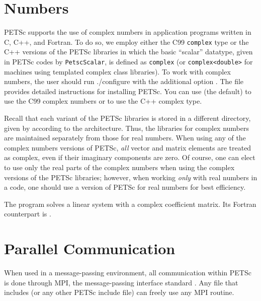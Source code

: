 {{\section{Numbers}  \label{sec_complex}

PETSc supports the use of complex numbers in application programs
written in C, C++, and Fortran.  To do so, we employ either the C99 \lstinline{complex} type or the C++ versions of
the PETSc libraries in which the basic ``scalar'' datatype, given in
PETSc codes by \lstinline{PetscScalar}, is defined as \lstinline{complex} (or \lstinline{complex<double>}
 for machines using templated complex class
libraries).  To work with complex numbers,
the user should run ./configure with the additional option .
The file \href{https://www.mcs.anl.gov/petsc/documentation/installation.html}{}
provides detailed instructions for installing PETSc. 
You can use  (the default) to use the C99 complex numbers or  to use the C++ complex type. 

Recall that each variant of the PETSc libraries is stored in a
different directory, given by
according to the architecture. Thus, the
libraries for complex
numbers are maintained separately from those for real
numbers.  When using any of the complex numbers versions of PETSc,
{\em all} vector and matrix elements are treated as complex,
even if their imaginary components are zero.
Of course, one can elect to use only the real parts of the complex
numbers when using the complex versions of the PETSc libraries;
however, when working {\em only} with real numbers in a code,
one should use a version of PETSc for real numbers for best efficiency.

The program \href{http://www.mcs.anl.gov/petsc/petsc-current/src/ksp/ksp/examples/tutorials/ex11.c.html}{}
solves a linear system with a complex
coefficient matrix.  Its Fortran counterpart is
\href{http://www.mcs.anl.gov/petsc/petsc-current/src/ksp/ksp/examples/tutorials/ex11f.F.html}{}.

\section{Parallel Communication}

When used in a message-passing environment, all communication 
within
PETSc is done through MPI, the message-passing interface standard
\cite{MPI-final}.  Any file that includes  (or any other
PETSc include file) can freely use any MPI routine.

}}
